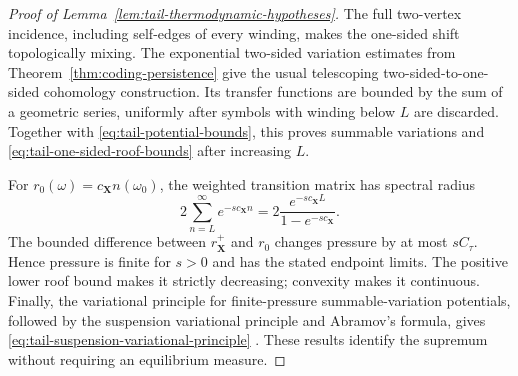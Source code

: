 \documentclass[11pt]{amsart}
\numberwithin{equation}{section}
\theoremstyle{definition}
\theoremstyle{remark}
\begin{document}
\begin{proof}[Proof of Lemma~\ref{lem:tail-thermodynamic-hypotheses}]
The full two-vertex incidence, including self-edges of every winding,
makes the one-sided shift topologically mixing.  The exponential
two-sided variation estimates from
Theorem~\ref{thm:coding-persistence} give the usual telescoping
two-sided-to-one-sided cohomology construction.  Its transfer functions
are bounded by the sum of a geometric series, uniformly after symbols with
winding below $L$ are discarded.  Together with
\eqref{eq:tail-potential-bounds}, this proves summable variations and
\eqref{eq:tail-one-sided-roof-bounds} after increasing $L$.

For $r_0(\omega)=c_{\mathbf X}n(\omega_0)$, the weighted transition matrix
has spectral radius
\[
 2\sum_{n=L}^{\infty}e^{-s c_{\mathbf X}n}
 =2\frac{e^{-s c_{\mathbf X}L}}{1-e^{-s c_{\mathbf X}}}.
\]
The bounded difference between $r_{\mathbf X}^+$ and $r_0$ changes
pressure by at most $sC_\tau$.  Hence pressure is finite for $s>0$ and
has the stated endpoint limits.  The positive lower roof bound makes it
strictly decreasing; convexity makes it continuous.  Finally, the
variational principle for finite-pressure summable-variation potentials,
followed by the suspension variational principle and Abramov's formula,
gives \eqref{eq:tail-suspension-variational-principle}
\cite{Sarig1999Thermodynamic,BarreiraIommi2006Suspension}.  These results
identify the supremum without requiring an equilibrium measure.
\end{proof}
\end{document}
